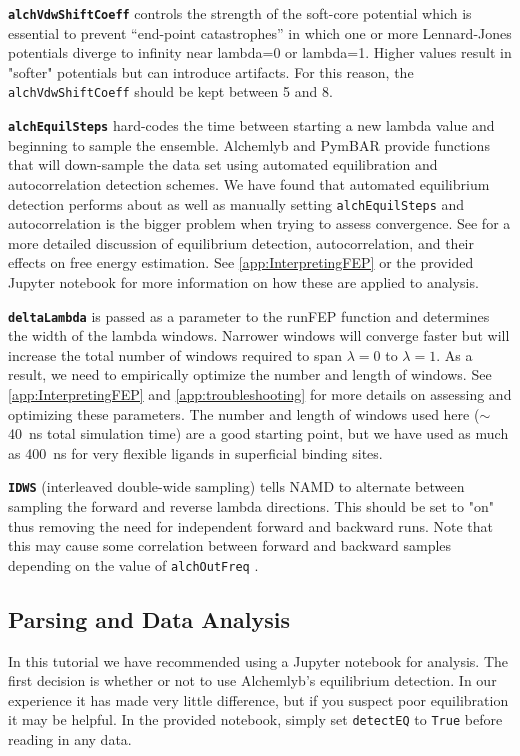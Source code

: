 \documentclass[9pt,tutorial]{Styling/livecoms}
\newcommand{\grace}[1]{\textcolor{red}{GB: #1}}
\newcommand{\textInput}[1]{
  \texttt{#1}
}
\begin{document}
\textbf{\textInput{alchVdwShiftCoeff}} controls the strength of the soft-core potential which is essential to prevent “end-point catastrophes” in which one or more Lennard-Jones potentials diverge to infinity near lambda=0 or lambda=1. Higher values result in "softer" potentials but can introduce artifacts. For this reason, the \textInput{alchVdwShiftCoeff} should be kept between 5 and 8.

\textbf{\textInput{alchEquilSteps}} hard-codes the time between starting a new lambda value and beginning to sample the ensemble. Alchemlyb and PymBAR provide functions that will down-sample the data set using automated equilibration and autocorrelation detection schemes. We have found that automated equilibrium detection performs about as well as manually setting \textInput{alchEquilSteps} and autocorrelation is the bigger problem when trying to assess convergence. See \cite{shirts2008statistically} for a more detailed discussion of equilibrium detection, autocorrelation, and their effects on free energy estimation. See \ref{app:InterpretingFEP} or the provided Jupyter notebook for more information on how these are applied to analysis.

\textbf{\textInput{deltaLambda}} is passed as a parameter to the runFEP function and determines the width of the lambda windows. Narrower windows will converge faster but will increase the total number of windows required to span $\lambda=0$ to $\lambda=1$. 
As a result, we need to empirically optimize the number and length of windows. 
See \ref{app:InterpretingFEP} and \ref{app:troubleshooting} for more details on assessing and optimizing these parameters. 
The number and length of windows used here ($\sim$ 40~ns total simulation time) are a good starting point, but we have used as much as 400~ns for very flexible ligands in superficial binding sites.\cite{Petroff2022} 

\textbf{\textInput{IDWS}} (interleaved double-wide sampling) %
tells NAMD to alternate between sampling the forward and reverse lambda directions. This should be set to "on" thus removing the need for independent forward and backward runs. Note that this may cause some correlation between forward and backward samples depending on the value of \textInput{alchOutFreq}.

\subsection{Parsing and Data Analysis}\label{app:Analysis}
In this tutorial we have recommended using a Jupyter notebook for analysis. The first decision is whether or not to use Alchemlyb's equilibrium detection. In our experience it has made very little difference, but if you suspect poor equilibration it may be helpful. In the provided notebook, simply set \textInput{detectEQ} to \textInput{True} before reading in any data.
\end{document}
